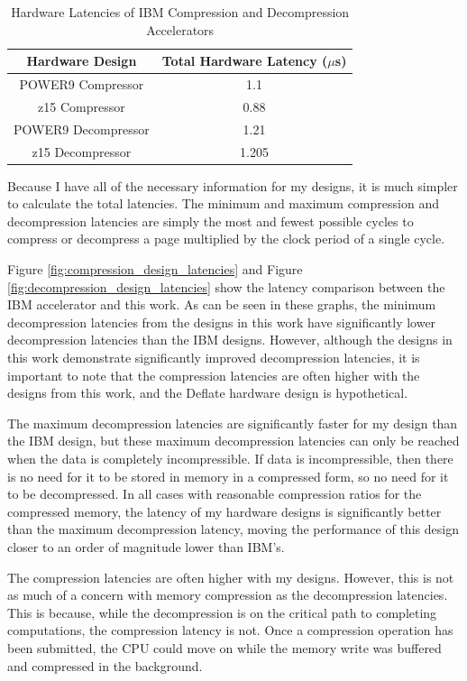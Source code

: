 \documentclass[doublespace,nopageskip]{VTthesis}
\begin{document}
\begin{table}[htb]
	\centering
	\caption{Hardware Latencies of IBM Compression and Decompression Accelerators}
	\begin{tabular}{cc}
	    \toprule
	    Hardware Design & Total Hardware Latency ($\mu$s) \\
		\midrule
		POWER9 Compressor & 1.1 \\
		\midrule
		z15 Compressor & 0.88 \\
		\midrule
		POWER9 Decompressor & 1.21 \\
		\midrule
		z15 Decompressor & 1.205 \\
		\bottomrule
	\end{tabular}
	\label{tab:ibm_latencies}
\end{table}

Because I have all of the necessary information for my designs, it is much simpler to calculate the total latencies. The minimum and maximum compression and decompression latencies are simply the most and fewest possible cycles to compress or decompress a page multiplied by the clock period of a single cycle.

Figure \ref{fig:compression_design_latencies} and Figure \ref{fig:decompression_design_latencies} show the latency comparison between the IBM accelerator and this work. As can be seen in these graphs, the minimum decompression latencies from the designs in this work have significantly lower decompression latencies than the IBM designs. However, although the designs in this work demonstrate significantly improved decompression latencies, it is important to note that the compression latencies are often higher with the designs from this work, and the Deflate hardware design is hypothetical.

The maximum decompression latencies are significantly faster for my design than the IBM design, but these maximum decompression latencies can only be reached when the data is completely incompressible. If data is incompressible, then there is no need for it to be stored in memory in a compressed form, so no need for it to be decompressed. In all cases with reasonable compression ratios for the compressed memory, the latency of my hardware designs is significantly better than the maximum decompression latency, moving the performance of this design closer to an order of magnitude lower than IBM's.

The compression latencies are often higher with my designs. However, this is not as much of a concern with memory compression as the decompression latencies. This is because, while the decompression is on the critical path to completing computations, the compression latency is not. Once a compression operation has been submitted, the CPU could move on while the memory write was buffered and compressed in the background.
\end{document}
